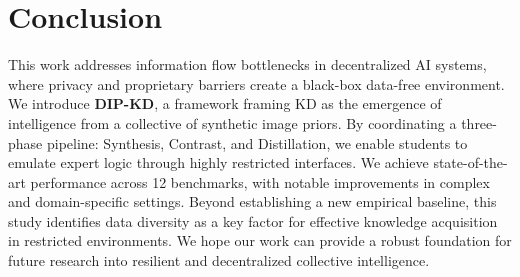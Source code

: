 \section{Conclusion} \label{sec:05-conclusion}

\begin{foldable}
  This work addresses information flow bottlenecks in decentralized AI systems, where privacy and proprietary barriers create a black-box data-free environment.
  We introduce \textbf{DIP-KD}, a framework framing KD as the emergence of intelligence from a collective of synthetic image priors.
  By coordinating a three-phase pipeline: Synthesis, Contrast, and Distillation, we enable students to emulate expert logic through highly restricted interfaces.
  We achieve state-of-the-art performance across 12 benchmarks, with notable improvements in complex and domain-specific settings.
  Beyond establishing a new empirical baseline, this study identifies data diversity as a key factor for effective knowledge acquisition in restricted environments.
  We hope our work can provide a robust foundation for future research into resilient and decentralized collective intelligence.
\end{foldable}
